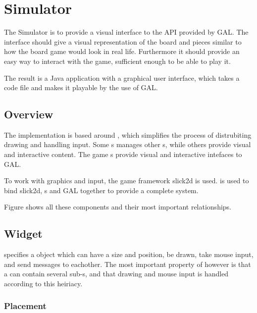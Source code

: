 \section{Simulator}

The Simulator is to provide a visual interface to the API provided by GAL. The interface should give a visual representation of the board and pieces similar to how the board game would look in real life. Furthermore it should provide an easy way to interact with the game, sufficient enough to be able to play it.

The result is a Java application with a graphical user interface, which takes a \productname code file and makes it playable by the use of GAL.


\subsection{Overview}

The implementation is based around , which simplifies the process of distrubiting drawing and handling input. Some s manages other s, while others provide visual and interactive content. The game s provide visual and interactive intefaces to GAL.

To work with graphics and input, the game framework slick2d is used.  is used to bind slick2d, s and GAL together to provide a complete system.

Figure  shows all these components and their most important relationships.



\subsection{Widget}

 specifies a object which can have a size and position, be drawn, take mouse input, and send messages to eachother. The most important property of  however is that a  can contain several sub-s, and that drawing and mouse input is handled according to this heiriacy.


\subsubsection{Placement}

